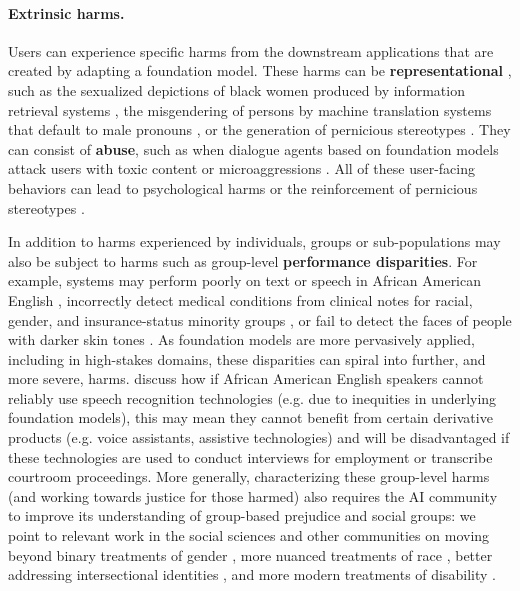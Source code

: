 \paragraph{Extrinsic harms.} Users can experience specific harms from the downstream applications that are created by adapting a foundation model. These harms can be \textbf{representational}  \citep{barocas17,crawford17,blodgett_language_2020}, such as the sexualized depictions of black women produced by information retrieval systems \citep{noble}, the misgendering of persons by machine translation systems that default to male pronouns \cite{schiebinger13,schiebinger14}, or the generation of pernicious stereotypes \citep{nozza21,sheng-etal-2019-woman, abid2021}. They can consist of \textbf{abuse}, such as when dialogue agents based on foundation models attack users with toxic content \cite{dinan21,gehman-etal-2020-realtoxicityprompts} or microaggressions \citep{breitfeller-etal-2019-finding,jurgens-etal-2019-just}. All of these user-facing behaviors can lead to psychological harms or the reinforcement of pernicious stereotypes \cite{spencer2016stereotype,williams2020psychology}.

In addition to harms experienced by individuals, groups or sub-populations may also be subject to harms such as group-level \textbf{performance disparities}. For example, systems may perform poorly on text or speech in African American English \citep{blodgett17,koenecke2020racial}, incorrectly detect medical conditions from clinical notes for racial, gender, and insurance-status minority groups \citep{zhang2020hurtful}, or fail to detect the faces of people with darker skin tones \citep{wilson19,buolamwini2018gender}. As foundation models are more pervasively applied, including in high-stakes domains, these disparities can spiral into further, and more severe, harms. 
\citet{koenecke2020racial} discuss how if African American English speakers cannot reliably use speech recognition technologies (e.g. due to inequities in underlying foundation models), this may mean they cannot benefit from certain derivative products (e.g. voice assistants, assistive technologies) and will be disadvantaged if these technologies are used to conduct interviews for employment or transcribe courtroom proceedings. More generally, characterizing these group-level harms (and working towards justice for those harmed) also requires the AI community to improve its understanding of group-based prejudice \citep{allport1954} and social groups: we point to relevant work in the social sciences and other communities on moving beyond binary treatments of gender \citep{lindsey2015, westbrook2015, richards2017, darwin2017, Keyes2018, hyde2019, cao2020, dinan2020}, more nuanced treatments of race \citep[e.g. ][]{penner2008, freeman2011,  saperstein2012, saperstein2013, penner2015, field2021}, better addressing intersectional identities \citep[e.g. ][]{crenshaw1989, nash2008, gines2011, penner2013, ghavami2013, bright2016, buolamwini2018gender, may2019, oconnor2019, guo2020}, and more modern treatments of disability \citep[e.g. ][]{batterbury2012, spiel2019, hutchinson2020}. 

